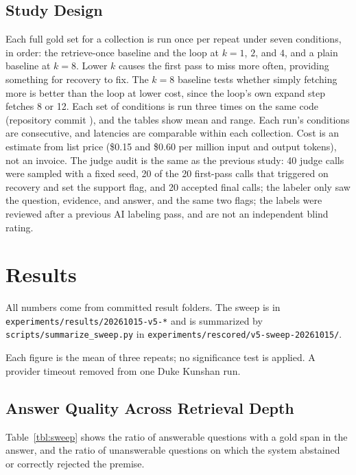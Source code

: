 \documentclass[12pt, a4paper, oneside]{report}
\newcommand{\code}[1]{\texttt{\detokenize{#1}}}
\begin{document}
\section{Study Design}

Each full gold set for a collection is run once per repeat under seven
conditions, in order: the retrieve-once baseline and the loop at $k=1$, $2$,
and $4$, and a plain baseline at $k=8$. Lower $k$ causes the first pass to
miss more often, providing something for recovery to fix. The $k=8$
baseline tests whether simply fetching more is better than the loop at
lower cost, since the loop's own expand step fetches 8 or 12. Each set of
conditions is run three times on the same code (repository commit
\code{b125064}), and the tables show mean and range. Each run's conditions
are consecutive, and latencies are comparable within each collection. Cost
is an estimate from list price (\$0.15 and \$0.60 per million input and
output tokens), not an invoice. The judge audit is the same as the previous
study: 40 judge calls were sampled with a fixed seed, 20 of the 20
first-pass calls that triggered on recovery and set the support flag, and 20
accepted final calls; the labeler only saw the question, evidence, and
answer, and the same two flags; the labels were reviewed after a previous AI
labeling pass, and are not an independent blind rating.


\chapter{Results}
\label{results}

{\raggedright All numbers come from committed result folders. The sweep is
in \texttt{experiments/results/20261015-v5-*} and is summarized by
\texttt{scripts/summarize\_sweep.py} in
\texttt{experiments/rescored/v5-sweep-20261015/}.\par}
Each figure is the mean of three repeats; no significance test is applied.
A provider timeout removed \code{dku-020} from one Duke Kunshan run.

\section{Answer Quality Across Retrieval Depth}

Table~\ref{tbl:sweep} shows the ratio of answerable questions with a gold
span in the answer, and the ratio of unanswerable questions on which the
system abstained or correctly rejected the premise.
\end{document}
